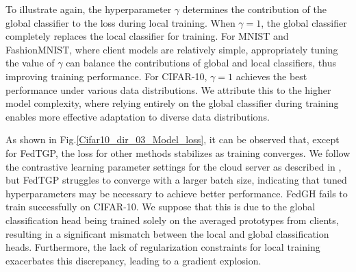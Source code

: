 \documentclass[journal]{IEEEtran}
\begin{document}
To illustrate again, the hyperparameter $\gamma$ determines the contribution of the global classifier to the loss during local training. When $\gamma=1$, the global classifier completely replaces the local classifier for training. For MNIST and FashionMNIST, where client models are relatively simple, appropriately tuning the value of $\gamma$ can balance the contributions of global and local classifiers, thus improving training performance. For CIFAR-10, $\gamma=1$ achieves the best performance under various data distributions. We attribute this to the higher model complexity, where relying entirely on the global classifier during training enables more effective adaptation to diverse data distributions.

As shown in Fig.\ref{Cifar10_dir_03_Model_loss}, it can be observed that, except for FedTGP, the loss for other methods stabilizes as training converges. We follow the contrastive learning parameter settings for the cloud server as described in \cite{zhang_fedtgp_2024}, but FedTGP struggles to converge with a larger batch size, indicating that tuned hyperparameters may be necessary to achieve better performance. FedGH fails to train successfully on CIFAR-10. We suppose that this is due to the global classification head being trained solely on the averaged prototypes from clients, resulting in a significant mismatch between the local and global classification heads. Furthermore, the lack of regularization constraints for local training exacerbates this discrepancy, leading to a gradient explosion.
\end{document}
